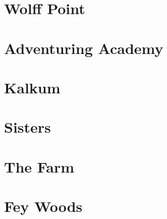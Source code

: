 

\begin{multicols}{2}

\section{Wolff Point}


\section{Adventuring Academy}


\section{Kalkum}


\section{Sisters}


\section{The Farm}


\section{Fey Woods}


\end{multicols}
